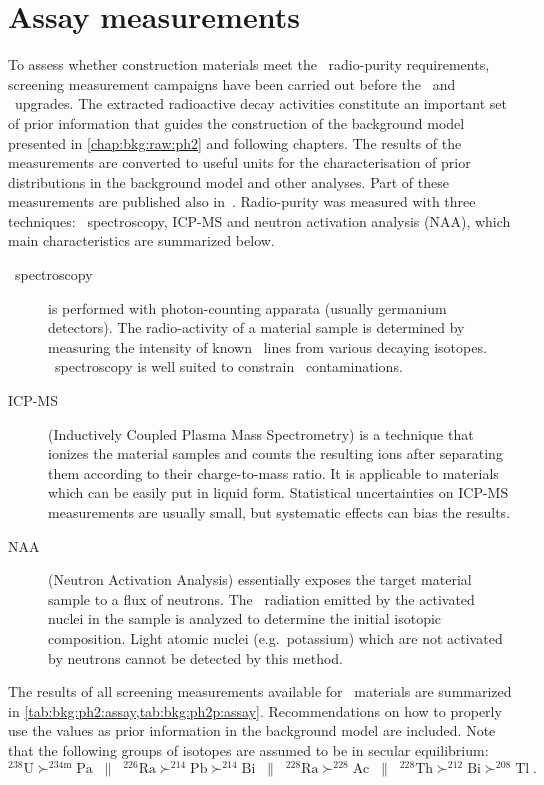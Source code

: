 
\chapter{Assay measurements}%
\label{apdx:assay}

To assess whether construction materials meet the \gerda\ radio-purity requirements,
screening measurement campaigns have been carried out before the \phasetwo\ and \phasetwop\
upgrades. The extracted radioactive decay activities constitute an important set of prior
information that guides the construction of the background model presented in
\cref{chap:bkg:raw:ph2} and following chapters. The results of the measurements are
converted to useful units for the characterisation of prior distributions in the
background model and other analyses. Part of these measurements are published also
in~\cite{Agostini2018a}.
\newpar
Radio-purity was measured with three techniques: \g\ spectroscopy, ICP-MS and neutron
activation analysis (NAA), which main characteristics are summarized below.
\begin{description}
  \item[\g\ spectroscopy] is performed with photon-counting apparata (usually germanium
    detectors). The radio-activity of a material sample is determined by measuring the
    intensity of known \g\ lines from various decaying isotopes. \g\ spectroscopy is
    well suited to constrain \kvn\ contaminations.
  \item[ICP-MS] (Inductively Coupled Plasma Mass Spectrometry) is a technique that ionizes
    the material samples and counts the resulting ions after separating them according to
    their charge-to-mass ratio. It is applicable to materials which can be easily put in
    liquid form. Statistical uncertainties on ICP-MS measurements are usually small, but
    systematic effects can bias the results.
  \item[NAA] (Neutron Activation Analysis) essentially exposes the target material sample
    to a flux of neutrons. The \g\ radiation emitted by the activated nuclei in the sample
    is analyzed to determine the initial isotopic composition. Light atomic nuclei
    (e.g.~potassium) which are not activated by neutrons cannot be detected by this
    method.
\end{description}

The results of all screening measurements available for \gerdatwo\ materials are
summarized in \cref{tab:bkg:ph2:assay,tab:bkg:ph2p:assay}. Recommendations on how to
properly use the values as prior information in the background model are included. Note
that the following groups of isotopes are assumed to be in secular equilibrium:
\[
  ^{238}\text{U}  \succ ^{234\text{m}}\text{Pa}               \;\; \| \;\;
  ^{226}\text{Ra} \succ ^{214}\text{Pb} \succ ^{214}\text{Bi} \;\; \| \;\;
  ^{228}\text{Ra} \succ ^{228}\text{Ac}                       \;\; \| \;\;
  ^{228}\text{Th} \succ ^{212}\text{Bi} \succ ^{208}\text{Tl} \;.
\]

